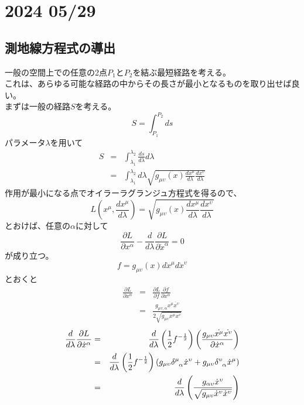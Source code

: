 \documentclass[dvipdfmx]{report} %
\begin{document}
\chapter{2024 05/29}

\section{
    測地線方程式の導出
}
一般の空間上での任意の2点$ P_1$と$P_2$を結ぶ最短経路を考える。\\
これは、あらゆる可能な経路の中からその長さが最小となるものを取り出せば良い。\\
まずは一般の経路$S$を考える。
$$
S = \int_{P_1}^{P_2} {ds}
$$
パラメータ$\lambda$を用いて
\begin{eqnarray*}
S &=& \int_{\lambda_1}^{\lambda_2} \frac{ ds }{ d\lambda } d\lambda \\
&=& \int_{\lambda_1}^{\lambda_2} d\lambda \sqrt{ g_{\mu \upsilon}(x) \frac{ dx^{\mu} }{ d\lambda }\frac{ dx^{\upsilon} }{ d\lambda } }
\end{eqnarray*}
作用が最小になる点でオイラーラグランジュ方程式を得るので、
$$
L\left( x^\mu, \frac{ dx^\mu }{ d\lambda } \right) = \sqrt{ g_{\mu \upsilon}(x) \frac{ dx^{\mu} }{ d\lambda }\frac{ dx^{\upsilon} }{ d\lambda } }
$$
とおけば、任意の$\alpha$に対して
$$
\frac{ \partial L }{ \partial x^\alpha } - \frac{ d }{ d \lambda } \frac{ \partial L }{ \partial \dot{x}^\alpha } = 0
$$
が成り立つ。
$$f = g_{\mu \upsilon}(x) d \dot{x}^{\mu} d \dot{x}^{\upsilon} $$
とおくと
\begin{eqnarray}
\frac{ \partial L }{ \partial x^\alpha } &=& \frac{ \partial L }{ \partial f } \frac{ \partial f }{ \partial x^\alpha } \nonumber \\
&=& \frac{ g_{\mu \upsilon , \alpha} \dot{x^\mu} \dot{x^\upsilon} }{ 2\sqrt{ g_{\mu \upsilon} \dot{x^\mu} \dot{x^\upsilon} } }
\end{eqnarray}
\begin{eqnarray}
\frac{ d }{ d\lambda } \frac{ \partial L }{ \partial \dot{x}^\alpha } &=& \frac{d}{d \lambda} \left( \frac{1}{2} f^{ - \frac{1}{2} } \right) \left( \frac{ g_{\mu \upsilon} \dot{x^\mu} \dot{x^\upsilon} }{ \partial \dot{x}^\alpha } \right) \nonumber \\ 
&=& \frac{d}{d \lambda} \left( \frac{1}{2} f^{ - \frac{1}{2} } \right) \left( g_{\mu \upsilon} \tensor{\delta}{^\mu_\alpha} \dot{x}^\upsilon + g_{\mu \upsilon} \tensor{\delta}{^\upsilon_\alpha} \dot{x}^\mu \right)\nonumber \\
&=& \frac{d}{d\lambda} \left( \frac{ g_{\alpha \upsilon}\dot{x}^{\upsilon} }{ \sqrt{g_{\mu \upsilon}\dot{x}^{\upsilon}  \dot{x}^{\upsilon} } } \right)
\end{eqnarray}
\end{document}
